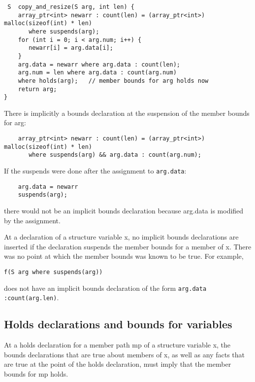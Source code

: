 \begin{verbatim}
 S  copy_and_resize(S arg, int len) {
    array_ptr<int> newarr : count(len) = (array_ptr<int>) malloc(sizeof(int) * len)
       where suspends(arg);
    for (int i = 0; i < arg.num; i++) {
       newarr[i] = arg.data[i];
    }
    arg.data = newarr where arg.data : count(len);
    arg.num = len where arg.data : count(arg.num)
    where holds(arg);   // member bounds for arg holds now
    return arg;
}
\end{verbatim}


There is implicitly a bounds declaration at the suspension of the member
bounds for arg:

\begin{verbatim}
    array_ptr<int> newarr : count(len) = (array_ptr<int>) malloc(sizeof(int) * len)
       where suspends(arg) && arg.data : count(arg.num);
\end{verbatim}

If the suspends were done after the assignment to \texttt{arg.data}:

\begin{verbatim}
    arg.data = newarr
    suspends(arg);
\end{verbatim}

there would not be an implicit bounds declaration because arg.data is
modified by the assignment.

At a declaration of a structure variable x, no implicit bounds
declarations are inserted if the declaration suspends the member bounds
for a member of x. There was no point at which the member bounds was
known to be true. For example,

\begin{verbatim}
f(S arg where suspends(arg))
\end{verbatim}

does not have an implicit bounds declaration of the form \verb|arg.data :count(arg.len)|.

\subsection{Holds declarations and bounds for variables}\label{holds-declarations-and-bounds-for-variables}

At a holds declaration for a member path mp of a structure variable x,
the bounds declarations that are true about members of x, as well as any
facts that are true at the point of the holds declaration, must imply
that the member bounds for mp holds.

